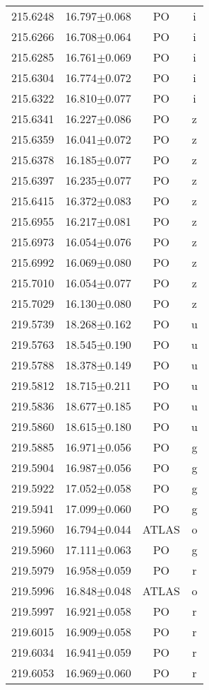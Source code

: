 \begin{table}
\begin{tabular}{cccc}
215.6248 & 16.797$\pm$0.068 & PO & i \\
215.6266 & 16.708$\pm$0.064 & PO & i \\
215.6285 & 16.761$\pm$0.069 & PO & i \\
215.6304 & 16.774$\pm$0.072 & PO & i \\
215.6322 & 16.810$\pm$0.077 & PO & i \\
215.6341 & 16.227$\pm$0.086 & PO & z \\
215.6359 & 16.041$\pm$0.072 & PO & z \\
215.6378 & 16.185$\pm$0.077 & PO & z \\
215.6397 & 16.235$\pm$0.077 & PO & z \\
215.6415 & 16.372$\pm$0.083 & PO & z \\
215.6955 & 16.217$\pm$0.081 & PO & z \\
215.6973 & 16.054$\pm$0.076 & PO & z \\
215.6992 & 16.069$\pm$0.080 & PO & z \\
215.7010 & 16.054$\pm$0.077 & PO & z \\
215.7029 & 16.130$\pm$0.080 & PO & z \\
219.5739 & 18.268$\pm$0.162 & PO & u \\
219.5763 & 18.545$\pm$0.190 & PO & u \\
219.5788 & 18.378$\pm$0.149 & PO & u \\
219.5812 & 18.715$\pm$0.211 & PO & u \\
219.5836 & 18.677$\pm$0.185 & PO & u \\
219.5860 & 18.615$\pm$0.180 & PO & u \\
219.5885 & 16.971$\pm$0.056 & PO & g \\
219.5904 & 16.987$\pm$0.056 & PO & g \\
219.5922 & 17.052$\pm$0.058 & PO & g \\
219.5941 & 17.099$\pm$0.060 & PO & g \\
219.5960 & 16.794$\pm$0.044 & ATLAS & o \\
219.5960 & 17.111$\pm$0.063 & PO & g \\
219.5979 & 16.958$\pm$0.059 & PO & r \\
219.5996 & 16.848$\pm$0.048 & ATLAS & o \\
219.5997 & 16.921$\pm$0.058 & PO & r \\
219.6015 & 16.909$\pm$0.058 & PO & r \\
219.6034 & 16.941$\pm$0.059 & PO & r \\
219.6053 & 16.969$\pm$0.060 & PO & r \\

\end{tabular}
\end{table}
